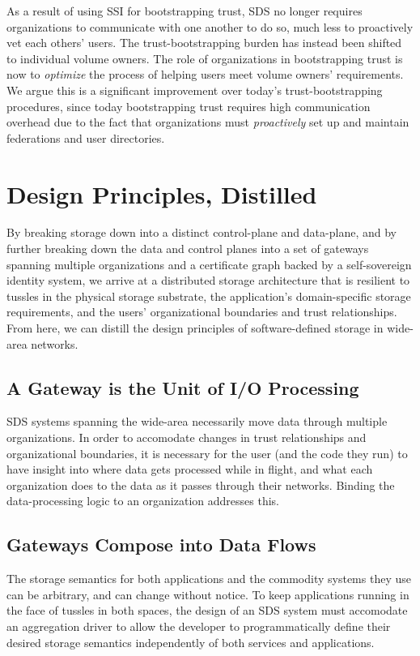 As a result of using SSI for bootstrapping trust, SDS no longer requires
organizations to communicate with one another to do so, much less to proactively vet each
others' users.  The trust-bootstrapping burden has instead been shifted to individual volume owners.
The role of organizations in bootstrapping trust is now to \emph{optimize} the
process of helping users meet volume owners' requirements.  We argue this is a
significant improvement over today's trust-bootstrapping procedures, since today
bootstrapping trust requires high communication overhead due to the fact that
organizations must \emph{proactively} set up and maintain federations and user
directories.

\section{Design Principles, Distilled}

By breaking storage down into a distinct control-plane and data-plane, and by
further breaking down the data and control planes into a set of gateways spanning multiple
organizations and a certificate graph backed by a self-sovereign identity system,
we arrive at a distributed storage architecture that is resilient
to tussles in the physical storage substrate, the application's
domain-specific storage requirements, and the users' organizational boundaries
and trust relationships.  From here, we can distill the design principles of
software-defined storage in wide-area networks.

\subsection{A Gateway is the Unit of I/O Processing}

SDS systems spanning the wide-area necessarily move data through multiple
organizations.  In order to accomodate changes in trust relationships
and organizational boundaries, it is necessary for the user (and the code they
run) to have insight into where data gets processed while in flight, and what
each organization does to the data as it passes through their networks.  Binding
the data-processing logic to an organization addresses this.

\subsection{Gateways Compose into Data Flows}

The storage semantics for both applications and the commodity systems they use can be
arbitrary, and can change without notice.  To keep applications running in the
face of tussles in both spaces, the design of an SDS system must
accomodate an aggregation driver
to allow the developer to programmatically define
their desired storage semantics independently of both services and
applications.

